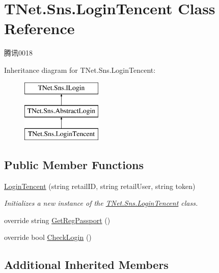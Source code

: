 \hypertarget{class_t_net_1_1_sns_1_1_login_tencent}{}\section{T\+Net.\+Sns.\+Login\+Tencent Class Reference}
\label{class_t_net_1_1_sns_1_1_login_tencent}


腾讯0018  


Inheritance diagram for T\+Net.\+Sns.\+Login\+Tencent\+:\begin{figure}[H]
\begin{center}
\leavevmode
\includegraphics[height=3.000000cm]{class_t_net_1_1_sns_1_1_login_tencent}
\end{center}
\end{figure}
\subsection*{Public Member Functions}
\begin{DoxyCompactItemize}
\item 
\mbox{\hyperlink{class_t_net_1_1_sns_1_1_login_tencent_a7ca293d0b05129e6292772228324f1c8}{Login\+Tencent}} (string retail\+ID, string retail\+User, string token)
\begin{DoxyCompactList}\small\item\em Initializes a new instance of the \mbox{\hyperlink{class_t_net_1_1_sns_1_1_login_tencent}{T\+Net.\+Sns.\+Login\+Tencent}} class. \end{DoxyCompactList}\item 
override string \mbox{\hyperlink{class_t_net_1_1_sns_1_1_login_tencent_abc09c476353f85c5e8a135d235bcb5c6}{Get\+Reg\+Passport}} ()
\item 
override bool \mbox{\hyperlink{class_t_net_1_1_sns_1_1_login_tencent_a47d0173c57f79fd4c14c5652046b2086}{Check\+Login}} ()
\end{DoxyCompactItemize}
\subsection*{Additional Inherited Members}


